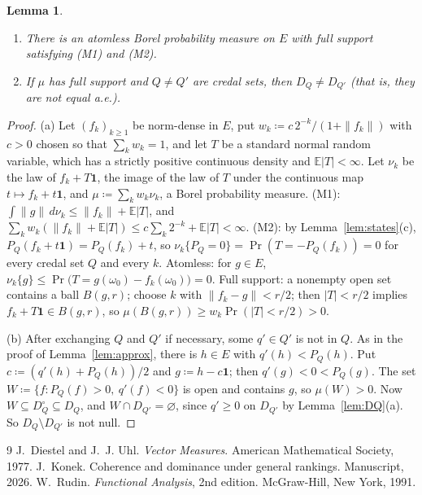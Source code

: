 \documentclass[11pt]{article}
\newtheorem{lemma}[theorem]{Lemma}
\theoremstyle{definition}
\newcommand{\one}{\mathbf 1}
\begin{document}
\begin{lemma}\label{lem:measures}
\begin{enumerate}[label=(\alph*)]
\item There is an atomless Borel probability measure on $E$ with full support satisfying (M1) and (M2).
\item If $\mu$ has full support and $Q\ne Q'$ are credal sets, then $D_Q\ne D_{Q'}$ (that is, they are not equal a.e.).
\end{enumerate}
\end{lemma}
\begin{proof}
(a) Let $(f_k)_{k\ge1}$ be norm-dense in $E$, put $w_k\coloneqq c\,2^{-k}/(1+\|f_k\|)$ with $c>0$ chosen so that $\sum_kw_k=1$, and let $T$ be a standard normal random variable, which has a strictly positive continuous density and $\mathbb E|T|<\infty$. Let $\nu_k$ be the law of $f_k+T\one$, the image of the law of $T$ under the continuous map $t\mapsto f_k+t\one$, and $\mu\coloneqq\sum_kw_k\nu_k$, a Borel probability measure.
(M1): $\int\|g\|\,d\nu_k\le\|f_k\|+\mathbb E|T|$, and $\sum_kw_k(\|f_k\|+\mathbb E|T|)\le c\sum_k2^{-k}+\mathbb E|T|<\infty$.
(M2): by Lemma~\ref{lem:states}(c), $P_Q(f_k+t\one)=P_Q(f_k)+t$, so $\nu_k\{P_Q=0\}=\Pr(T=-P_Q(f_k))=0$ for every credal set $Q$ and every $k$.
Atomless: for $g\in E$, $\nu_k\{g\}\le\Pr\bigl(T=g(\omega_0)-f_k(\omega_0)\bigr)=0$.
Full support: a nonempty open set contains a ball $B(g,r)$; choose $k$ with $\|f_k-g\|<r/2$; then $|T|<r/2$ implies $f_k+T\one\in B(g,r)$, so $\mu(B(g,r))\ge w_k\Pr(|T|<r/2)>0$.

(b) After exchanging $Q$ and $Q'$ if necessary, some $q'\in Q'$ is not in $Q$. As in the proof of Lemma~\ref{lem:approx}, there is $h\in E$ with $q'(h)<P_Q(h)$. Put $c\coloneqq(q'(h)+P_Q(h))/2$ and $g\coloneqq h-c\one$; then $q'(g)<0<P_Q(g)$. The set $W\coloneqq\{f:P_Q(f)>0,\ q'(f)<0\}$ is open and contains $g$, so $\mu(W)>0$. Now $W\subseteq D^\circ_Q\subseteq D_Q$, and $W\cap D_{Q'}=\varnothing$, since $q'\ge0$ on $D_{Q'}$ by Lemma~\ref{lem:DQ}(a). So $D_Q\setminus D_{Q'}$ is not null.
\end{proof}

\begin{thebibliography}{9}
 J.~Diestel and J.~J. Uhl. \emph{Vector Measures}. American Mathematical Society, 1977.
 J.~Konek. Coherence and dominance under general rankings. Manuscript, 2026.
 W.~Rudin. \emph{Functional Analysis}, 2nd edition. McGraw-Hill, New York, 1991.
\end{thebibliography}
\end{document}
